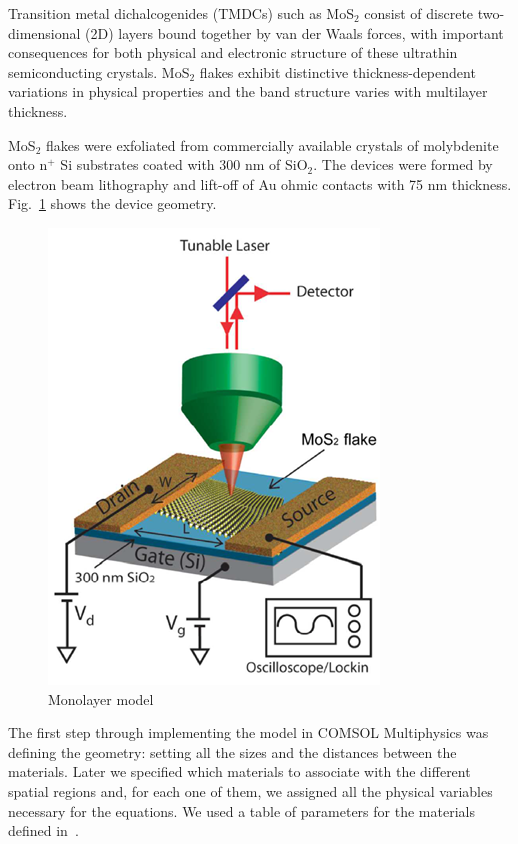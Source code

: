 \documentclass[12pt,a4paper,titlepage]{article}
\begin{document}
Transition metal dichalcogenides (TMDCs) such as MoS$_2$ consist of discrete two-dimensional (2D) layers bound together by van der Waals forces, with important consequences for both physical and electronic structure of these ultrathin semiconducting crystals. MoS$_2$ flakes exhibit distinctive thickness-dependent variations in physical properties and the band structure varies with multilayer thickness.

MoS$_2$ flakes were exfoliated from commercially available crystals of molybdenite onto n$^+$ Si substrates coated with 300 nm of SiO$_2$. The devices were formed by electron beam lithography and lift-off of Au ohmic contacts with 75 nm thickness. Fig.~\ref{fig:monolayer_model} shows the device geometry.

\begin{figure}[H]
	\centering
	\includegraphics[width=.5\textwidth]{Immagini/monolayer_model.png} 
	\caption{Monolayer model~\cite{Wu:Ultrathin_MoS2}}
	\label{fig:monolayer_model}
\end{figure} 

The first step through implementing the model in COMSOL Multiphysics was defining the geometry: setting all the sizes and the distances between the materials. Later we specified which materials to associate with the different spatial regions and, for each one of them, we assigned all the physical variables necessary for the equations. We used a table of parameters for the materials defined in~\cite{Howell:MonolayerMultiLayer_MoS2}.
\end{document}
